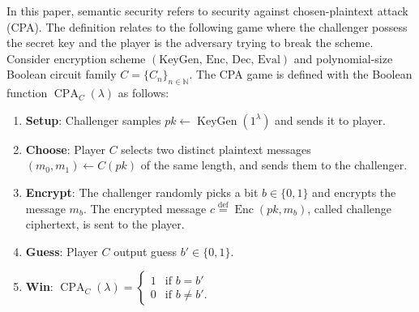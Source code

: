 In this paper, semantic security refers to security against chosen-plaintext attack (CPA). The definition relates to the following game where the challenger possess the secret key and the player is the adversary trying to break the scheme. Consider encryption scheme $(\text{KeyGen, Enc, Dec, Eval})$ and polynomial-size Boolean circuit family $C = \{C_n\}_{n\in \mathbb{N}}$. The CPA game is defined with the Boolean function $\operatorname{CPA}_{C}(\lambda)$ as follows:
\begin{enumerate}
  \item \textbf{Setup}: Challenger samples $pk \leftarrow \operatorname{KeyGen}(1^{\lambda})$ and sends it to player.
  \item \textbf{Choose}: Player $C$ selects two distinct plaintext messages $(m_0, m_1) \leftarrow C(pk)$ of the same length, and sends them to the challenger.
  \item \textbf{Encrypt}: The challenger randomly picks a bit $b \in \{0, 1\}$ and encrypts the message $m_b$. The encrypted message $c \stackrel{\mathrm{def}}{=} \operatorname{Enc}(pk, m_b)$, called challenge ciphertext, is sent to the player.
  \item \textbf{Guess}: Player $C$ output guess $b' \in \{0,1\}$.
  \item \textbf{Win}: $\operatorname{CPA}_{C}(\lambda) = 
  \begin{cases}
  1 & \text{if } b = b'\\
  0 & \text{if } b \neq b'.
  \end{cases}$
\end{enumerate}

